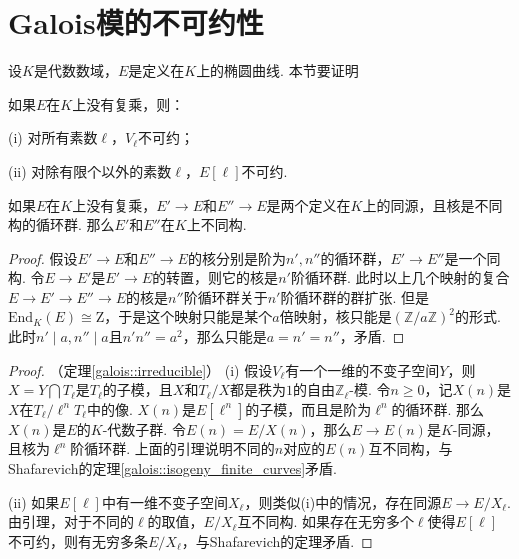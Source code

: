 \section{Galois模的不可约性}

设$K$是代数数域，$E$是定义在$K$上的椭圆曲线. 本节要证明

\begin{cthm}
    如果$E$在$K$上没有复乘，则：

    (i) 对所有素数$\ell$，$V_{\ell}$不可约；

    (ii) 对除有限个以外的素数$\ell$，$E[\ell]$不可约.
    \label{galois::irreducible}
\end{cthm}

\begin{clem}
    如果$E$在$K$上没有复乘，$E'\to E$和$E''\to E$是两个定义在$K$上的同源，且核是不同构的循环群. 那么$E'$和$E''$在$K$上不同构.
\end{clem}

\begin{proof}
    假设$E'\to E$和$E''\to E$的核分别是阶为$n', n''$的循环群，$E'\to E''$是一个同构. 令$E\to E'$是$E'\to E$的转置，则它的核是$n'$阶循环群. 此时以上几个映射的复合$E\to E'\to E''\to E$的核是$n''$阶循环群关于$n'$阶循环群的群扩张. 但是$\mathrm{End}_K(E) \cong \mathrm{Z}$，于是这个映射只能是某个$a$倍映射，核只能是$(\mathbb{Z}/a\mathbb{Z})^2$的形式. 此时$n'\mid a, n''\mid a$且$n'n''=a^2$，那么只能是$a=n'=n''$，矛盾.
\end{proof}

\begin{proof}
    （定理\ref{galois::irreducible}）
    (i) 假设$V_{\ell}$有一个一维的不变子空间$Y$，则$X=Y\bigcap T_{\ell}$是$T_{\ell}$的子模，且$X$和$T_{\ell}/X$都是秩为$1$的自由$\mathbb{Z}_{\ell}$-模. 令$n\geq 0$，记$X(n)$是$X$在$T_{\ell} / \ell^n T_{\ell}$中的像. $X(n)$是$E[\ell^n]$的子模，而且是阶为$\ell^n$的循环群. 那么$X(n)$是$E$的$K$-代数子群. 令$E(n) = E/X(n)$，那么$E\to E(n)$是$K$-同源，且核为$\ell^n$阶循环群. 上面的引理说明不同的$n$对应的$E(n)$互不同构，与Shafarevich的定理\ref{galois::isogeny_finite_curves}矛盾.

    (ii) 如果$E[\ell]$中有一维不变子空间$X_{\ell}$，则类似(i)中的情况，存在同源$E\to E/X_{\ell}$. 由引理，对于不同的$\ell$的取值，$E/X_{\ell}$互不同构. 如果存在无穷多个$\ell$使得$E[\ell]$不可约，则有无穷多条$E/X_{\ell}$，与Shafarevich的定理矛盾.
\end{proof}
